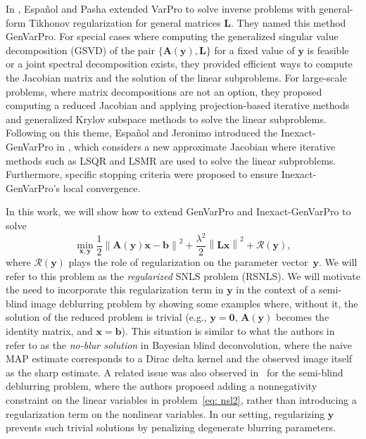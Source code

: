 \documentclass[onefignum,onetabnum]{siamart171218}
\begin{document}
In \cite{Espanol_2023}, Espa\~nol and Pasha extended VarPro to solve inverse problems with general-form Tikhonov regularization for general matrices $\mathbf{L}$. They named this method GenVarPro. For special cases where computing the generalized singular value decomposition (GSVD) of the pair $\{\mathbf{A}(\mathbf{y}),\mathbf{L}\}$ for a fixed value of $\mathbf{y}$ is feasible or a joint spectral decomposition exists, they provided efficient ways to compute the Jacobian matrix and the solution of the linear subproblems. For large-scale problems, where matrix decompositions are not an option, they proposed computing a reduced Jacobian and applying projection-based iterative methods and generalized Krylov subspace methods to solve the linear subproblems.
Following on this theme, Espa\~nol and Jeronimo introduced the Inexact-GenVarPro in \cite{espanol2025local}, which considers a new approximate Jacobian where iterative methods such as LSQR and LSMR are used to solve the linear subproblems. Furthermore, specific stopping criteria were proposed to ensure Inexact-GenVarPro's local convergence.

In this work, we will show how to extend GenVarPro and Inexact-GenVarPro to solve
\begin{equation}\label{eq: nlls_regy}
\min_{\mathbf{x}, \mathbf{y}} \frac{1}{2}\left\|\mathbf{A}(\mathbf{y})\mathbf{x} - \mathbf{b} \right\|^2 + \frac{\lambda^2}{2} \left\|\mathbf{L} \mathbf{x}\right\|^2 + \mathcal{R}(\mathbf{y}),
\end{equation}
where $\mathcal{R}(\mathbf{y})$ plays the role of regularization on the parameter vector~$\mathbf{y}$. We will refer to this problem as the \emph{regularized} SNLS problem (RSNLS). We will motivate the need to incorporate this regularization term in $\mathbf{y}$ in the context of a semi-blind image deblurring problem by showing some examples where, without it, the solution of the reduced problem is trivial (e.g., $\mathbf{y}=\boldsymbol{0}$, $\mathbf{A}(\mathbf{y})$ becomes the identity matrix, and $\mathbf{x}=\mathbf{b}$). 
This situation is similar to what the authors in~\cite{levin2009understanding} refer to as the \emph{no-blur solution} in Bayesian blind deconvolution, where the naive MAP estimate corresponds to a Dirac delta kernel and the observed image itself as the sharp estimate. A related issue was also observed in~\cite{cornelio2014constrained} for the semi-blind deblurring problem, where the authors proposed adding a nonnegativity constraint on the linear variables in problem~\eqref{eq: nsl2}, rather than introducing a regularization term on the nonlinear variables. 
In our setting, regularizing $\mathbf{y}$ prevents such trivial solutions by penalizing degenerate blurring parameters.
\end{document}
